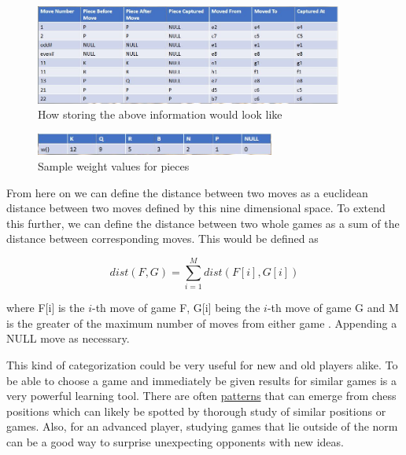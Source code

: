\documentclass[12pt]{article}
\begin{document}
    
        \begin{figure}[ht]
            \centering
            \caption{How storing the above information would look like}
            \label{fig:storing9d}
            \includegraphics[width=0.9\textwidth]{9dboard.jpg}
        \end{figure}
        \begin{figure}[ht]
            \centering
            \caption{Sample weight values for pieces}
            \label{fig:piece_weights}
            \includegraphics[width=0.7\textwidth]{sampleweights.jpg}
        \end{figure}

    From here on we can define the distance between two moves as a euclidean distance between two moves defined by this nine dimensional space. To extend this further, we can define the distance between two whole games as a sum of the distance between corresponding moves. This would be defined as 

    \begin{equation}
        dist(F, G) = \sum^{M}_{i=1} dist(F[i], G[i])
    \end{equation}

    where F[i] is the $i$-th move of game F, G[i] being the $i$-th move of game G and M is the greater of the maximum number of moves from either game \cite{main}. Appending a NULL move as necessary.

    This kind of categorization could be very useful for new and old players alike. To be able to choose a game and immediately be given results for similar games is a very powerful learning tool. There are often \href{https://www.chessstrategyonline.com/content/tutorials/basic-checkmates-smothered-mate}{patterns} that can emerge from chess positions which can likely be spotted by thorough study of similar positions or games. Also, for an advanced player, studying games that lie outside of the norm can be a good way to surprise unexpecting opponents with new ideas.
\end{document}
